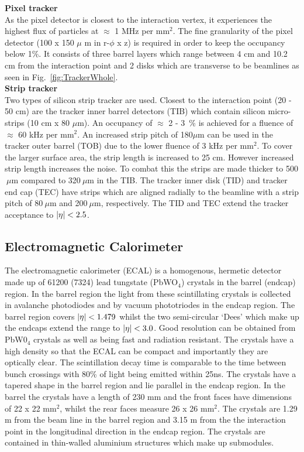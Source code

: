 \textbf{Pixel tracker}\\

As the pixel detector is closest to the interaction vertex, it experiences the highest flux of particles at $\approx$ 1 MHz per mm$^{2}$. The fine granularity of the pixel detector (100 x 150 $\mu$ m in r-$\phi$ x z) is required in order to keep the occupancy below 1\%. It consists of three barrel layers which range between 4 cm and 10.2 cm from the interaction point and 2 disks which are transverse to be beamlines as seen in Fig.~\ref{fig:TrackerWhole}.\\

\textbf{Strip tracker}\\
Two types of silicon strip tracker are used. Closest to the interaction point (20 - 50 cm) are the tracker inner barrel detectors (TIB) which contain silicon micro-strips (10 cm x 80 $\mu$m). An occupancy of $\approx$ 2 - 3~\% is achieved for a fluence of $\approx$ 60 kHz per mm$^{2}$.
An increased strip pitch of 180$\mu$m can be used in the tracker outer barrel (TOB) due to the lower fluence of 3 kHz per mm$^{2}$. To cover the larger surface area, the strip length is increased to 25 cm. However increased strip length increases the noise. To combat this the strips are made thicker to 500$~\mu$m compared to 320$~\mu$m in the TIB.
The tracker inner disk (TID) and tracker end cap (TEC) have strips which are aligned radially to the beamline with a strip pitch of 80$~\mu$m and 200$~\mu$m, respectively. The TID and TEC extend the tracker acceptance to $\lvert \eta \rvert<2.5$.

\subsection{Electromagnetic Calorimeter}

The electromagnetic calorimeter (ECAL) is a homogenous, hermetic detector made up of 61200 (7324) lead tungstate (PbWO$_{4}$) crystals in the barrel (endcap) region. In the barrel region the light from these scintillating crystals is collected in avalanche photodiodes and by vacuum phototriodes in the endcap region. The barrel region covers $\lvert \eta \rvert<1.479$ whilst the two semi-circular `Dees' which make up the endcaps extend the range to $\lvert \eta \rvert<3.0$. Good resolution can be obtained from PbW0$_{4}$ crystals as well as being fast and radiation resistant. The crystals have a high density so that the ECAL can be compact and importantly they are optically clear. The scintillation decay time is comparable to the time between bunch crossings with 80\% of light being emitted within 25ns. The crystals have a tapered shape in the barrel region and lie parallel in the endcap region. In the barrel the crystals have a length of 230 mm and the front faces have dimensions of 22 x 22 mm$^{2}$, whilst the rear faces measure 26 x 26 mm$^{2}$. The crystals are 1.29 m from the beam line in the barrel region and 3.15 m from the the interaction point in the longitudinal direction in the endcap region. The crystals are contained in thin-walled aluminium structures which make up submodules.


